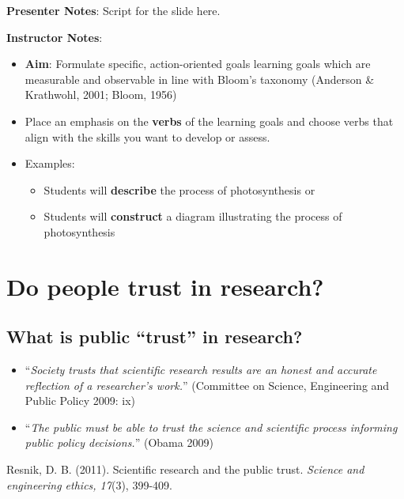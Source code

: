 \documentclass[
  letterpaper,
  DIV=11,
  numbers=noendperiod]{scrartcl}
\providecommand{\tightlist}{%
  \setlength{\itemsep}{0pt}\setlength{\parskip}{0pt}}
\begin{document}
\textbf{Presenter Notes}: Script for the slide here.

\textbf{Instructor Notes}:

\begin{itemize}
\item
  \textbf{Aim}: Formulate specific, action-oriented goals learning goals
  which are measurable and observable in line with Bloom's taxonomy
  (Anderson \& Krathwohl, 2001; Bloom, 1956)
\item
  Place an emphasis on the \textbf{verbs} of the learning goals and
  choose verbs that align with the skills you want to develop or assess.
\item
  Examples:

  \begin{itemize}
  \tightlist
  \item
    Students will \textbf{describe} the process of photosynthesis or
  \item
    Students will \textbf{construct} a diagram illustrating the process
    of photosynthesis
  \end{itemize}
\end{itemize}

\section{Do people trust in
research?}\label{do-people-trust-in-research}

\subsection{What is public ``trust'' in
research?}\label{what-is-public-trust-in-research}

\begin{itemize}
\item
  ``\emph{Society trusts that scientific research results are an honest
  and accurate reflection of a researcher's work.}'' {(Committee on
  Science, Engineering and Public Policy 2009: ix)}
\item
  ``\emph{The public must be able to trust the science and scientific
  process informing public policy decisions.}'' {(Obama 2009)}
\end{itemize}

Resnik, D. B. (2011). Scientific research and the public trust.
\emph{Science and engineering ethics, 17}(3), 399-409.
\end{document}
